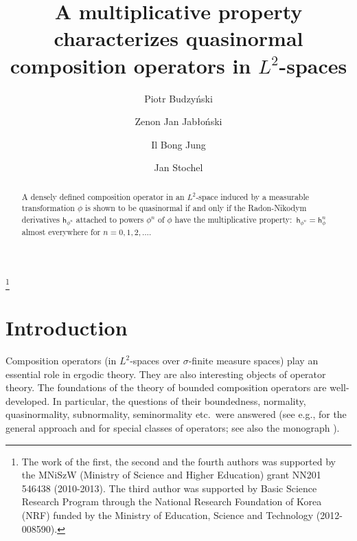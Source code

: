 \documentclass[draft,reqno]{amsproc}
\numberwithin{equation}{section}
\theoremstyle{remark}
\theoremstyle{definition}
\begin{document}
   \title[Quasinormal composition
operators in $L^2$-spaces]{A multiplicative property
characterizes quasinormal composition operators in
$L^2$-spaces}
   \author[P.\ Budzy\'{n}ski]{Piotr Budzy\'{n}ski}
   \address{Katedra Zastosowa\'{n} Matematyki,
Uniwersytet Rolniczy w Krakowie, ul.\ Balicka 253c,
PL-30198 Krak\'ow, Poland}
   \author[Z.\ J.\ Jab{\l}o\'nski]{Zenon Jan
Jab{\l}o\'nski}
   \address{Instytut Matematyki,
Uniwersytet Jagiello\'nski, ul.\ \L ojasiewicza 6,
PL-30348 Kra\-k\'ow, Poland}
   \author[I.\ B.\ Jung]{Il Bong Jung}
   \address{Department of Mathematics, Kyungpook National
University, Daegu 702-701, Korea}
   \author[J.\ Stochel]{Jan Stochel}
\address{Instytut Matematyki, Uniwersytet
Jagiello\'nski, ul.\ \L ojasiewicza 6, PL-30348
Kra\-k\'ow, Poland}
   \thanks{The work of the first, the second
and the fourth authors was supported by the MNiSzW
(Ministry of Science and Higher Education) grant NN201
546438 (2010-2013). The third author was supported by
Basic Science Research Program through the National
Research Foundation of Korea (NRF) funded by the
Ministry of Education, Science and Technology
(2012-008590).}
   \begin{abstract}
A densely defined composition operator in an
$L^2$-space induced by a measurable transformation
$\phi$ is shown to be quasinormal if and only if the
Radon-Nikodym derivatives ${\mathsf h}_{\phi^n}$ attached to
powers $\phi^n$ of $\phi$ have the multiplicative
property:\ ${\mathsf h}_{\phi^n} = {\mathsf h}_{\phi}^n$ almost
everywhere for $n = 0, 1, 2, \ldots$.
   \end{abstract}
   \maketitle
   \section{Introduction}
Composition operators (in $L^2$-spaces over
$\sigma$-finite measure spaces) play an essential role
in ergodic theory. They are also interesting objects
of operator theory. The foundations of the theory of
bounded composition operators are well-developed. In
particular, the questions of their boundedness,
normality, quasinormality, subnormality, seminormality
etc.\ were answered (see e.g.,
\cite{sin,nor,wh,ha-wh,lam1,lam2,di-ca,emb-lam3,sin-man,bu-ju-la}
for the general approach and
\cite{emb-lam2,ml,sto,da-st,2xSt} for special classes
of operators; see also the monograph \cite{sin-man}).
\end{document}
